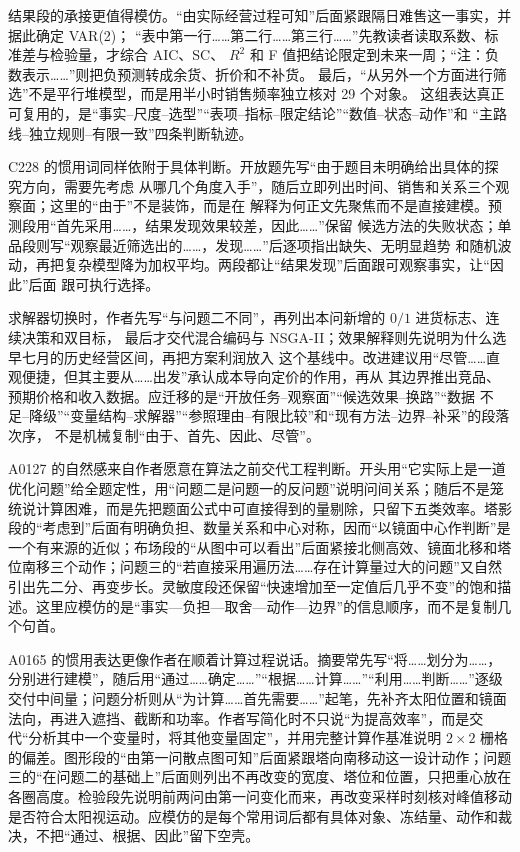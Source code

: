 \documentclass[UTF8,a4paper,12pt]{ctexart}
\begin{document}
结果段的承接更值得模仿。“由实际经营过程可知”后面紧跟隔日难售这一事实，并据此确定 VAR(2)；
“表中第一行……第二行……第三行……”先教读者读取系数、标准差与检验量，才综合 AIC、SC、
$R^2$ 和 F 值把结论限定到未来一周；“注：负数表示……”则把负预测转成余货、折价和不补货。
最后，“从另外一个方面进行筛选”不是平行堆模型，而是用半小时销售频率独立核对 29 个对象。
这组表达真正可复用的，是“事实--尺度--选型”“表项--指标--限定结论”“数值--状态--动作”和
“主路线--独立规则--有限一致”四条判断轨迹。

C228 的惯用词同样依附于具体判断。开放题先写“由于题目未明确给出具体的探究方向，需要先考虑
从哪几个角度入手”，随后立即列出时间、销售和关系三个观察面；这里的“由于”不是装饰，而是在
解释为何正文先聚焦而不是直接建模。预测段用“首先采用……，结果发现效果较差，因此……”保留
候选方法的失败状态；单品段则写“观察最近筛选出的……，发现……”后逐项指出缺失、无明显趋势
和随机波动，再把复杂模型降为加权平均。两段都让“结果发现”后面跟可观察事实，让“因此”后面
跟可执行选择。

求解器切换时，作者先写“与问题二不同”，再列出本问新增的 $0/1$ 进货标志、连续决策和双目标，
最后才交代混合编码与 NSGA-II；效果解释则先说明为什么选早七月的历史经营区间，再把方案利润放入
这个基线中。改进建议用“尽管……直观便捷，但其主要从……出发”承认成本导向定价的作用，再从
其边界推出竞品、预期价格和收入数据。应迁移的是“开放任务--观察面”“候选效果--换路”“数据
不足--降级”“变量结构--求解器”“参照理由--有限比较”和“现有方法--边界--补采”的段落次序，
不是机械复制“由于、首先、因此、尽管”。

A0127 的自然感来自作者愿意在算法之前交代工程判断。开头用“它实际上是一道优化问题”给全题定性，用“问题二是问题一的反问题”说明问间关系；随后不是笼统说计算困难，而是先把题面公式中可直接得到的量剔除，只留下五类效率。塔影段的“考虑到”后面有明确负担、数量关系和中心对称，因而“以镜面中心作判断”是一个有来源的近似；布场段的“从图中可以看出”后面紧接北侧高效、镜面北移和塔位南移三个动作；问题三的“若直接采用遍历法……存在计算量过大的问题”又自然引出先二分、再变步长。灵敏度段还保留“快速增加至一定值后几乎不变”的饱和描述。这里应模仿的是“事实—负担—取舍—动作—边界”的信息顺序，而不是复制几个句首。

A0165 的惯用表达更像作者在顺着计算过程说话。摘要常先写“将……划分为……，分别进行建模”，随后用“通过……确定……”“根据……计算……”“利用……判断……”逐级交付中间量；问题分析则从“为计算……首先需要……”起笔，先补齐太阳位置和镜面法向，再进入遮挡、截断和功率。作者写简化时不只说“为提高效率”，而是交代“分析其中一个变量时，将其他变量固定”，并用完整计算作基准说明 $2\times2$ 栅格的偏差。图形段的“由第一问散点图可知”后面紧跟塔向南移动这一设计动作；问题三的“在问题二的基础上”后面则列出不再改变的宽度、塔位和位置，只把重心放在各圈高度。检验段先说明前两问由第一问变化而来，再改变采样时刻核对峰值移动是否符合太阳视运动。应模仿的是每个常用词后都有具体对象、冻结量、动作和裁决，不把“通过、根据、因此”留下空壳。
\end{document}
